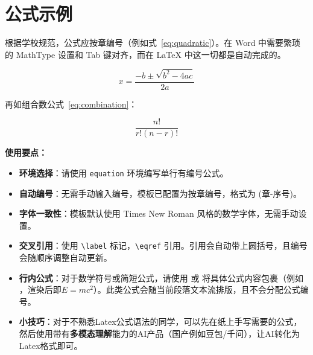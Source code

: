 
\section{公式示例}
根据学校规范，公式应按章编号（例如式~\eqref{eq:quadratic}）。在 Word 中需要繁琐的 MathType 设置和 Tab 键对齐，而在 \LaTeX{} 中这一切都是自动完成的。

\begin{equation}
  x = \frac{-b \pm \sqrt{b^2 - 4ac}}{2a}
  \label{eq:quadratic}
\end{equation}

再如组合数公式~\eqref{eq:combination}：

\begin{equation}
  \frac{n!}{r!(n-r)!}
  \label{eq:combination}
\end{equation}

\textbf{使用要点：}
\begin{itemize}
    \item \textbf{环境选择}：请使用 \texttt{equation} 环境编写单行有编号公式。
    \item \textbf{自动编号}：无需手动输入编号，模板已配置为按章编号，格式为 (章-序号)。
    \item \textbf{字体一致性}：模板默认使用 Times New Roman 风格的数学字体，无需手动设置。
    \item \textbf{交叉引用}：使用 \texttt{\textbackslash label} 标记，\texttt{\textbackslash eqref} 引用。引用会自动带上圆括号，且编号会随顺序调整自动更新。
    \item \textbf{行内公式}：对于数学符号或简短公式，请使用 \texttt{} 或 \texttt{} 将具体公式内容包裹（例如 \texttt{}，渲染后即$E=mc^2$）。此类公式会随当前段落文本流排版，且不会分配公式编号。
    \item \textbf{小技巧}：对于不熟悉Latex公式语法的同学，可以先在纸上手写需要的公式，然后使用带有\textbf{多模态理解}能力的AI产品（国产例如豆包/千问），让AI转化为Latex格式即可。
\end{itemize}
